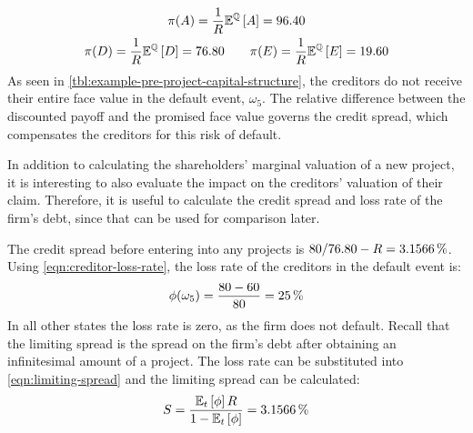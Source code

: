 \documentclass[main.tex]{subfiles}
\begin{document}
        \begin{gather*}
            \pi(A) = \frac{1}{R} \mathbb{E}^{\mathbb{Q}}\left[A\right] = \num{96.40} \\
            \pi(D) = \frac{1}{R} \mathbb{E}^{\mathbb{Q}}\left[D\right] = \num{76.80}
            \qquad \pi(E) = \frac{1}{R} \mathbb{E}^{\mathbb{Q}}\left[E\right] = \num{19.60}
        \end{gather*}
    As seen in \cref{tbl:example-pre-project-capital-structure},
    the creditors do not receive their entire face value in the default event, $\omega_5$.
    The relative difference between the discounted payoff and the promised face value
    governs the credit spread, which compensates the creditors for this risk of default.

    In addition to calculating the shareholders' marginal valuation of a new project,
    it is interesting to also evaluate the impact on the creditors' valuation of their claim. 
    Therefore, it is useful to calculate the credit spread and loss rate of the firm's debt,
    since that can be used for comparison later.

    The credit spread before entering into any projects is 
    $\num{80}/\num{76.80} - \grossrfrate = \pct{0.031566}$.
    Using \cref{eqn:creditor-loss-rate}, the loss rate of the creditors in the default event is:
        \begin{equation*}
            \phi(\omega_{5}) 
            = 
                \frac{
                    \num{80}-\num{60}
                }{
                    \num{80}
                } 
            = 
                \pct{0.25}
        \end{equation*}
    In all other states the loss rate is zero, as the firm does not default.
    Recall that the limiting spread is the spread on the firm's debt 
    after obtaining an infinitesimal amount of a project. 
    The loss rate can be substituted into \cref{eqn:limiting-spread} 
    and the limiting spread can be calculated:
        \begin{equation*}
            S
            =
            \frac{
                \mathbb{E}_{t}\left[\phi\right]
                R
            }{
                1 
                -
                \mathbb{E}_{t}\left[\phi\right] 
            } 
            =
            \pct{0.031566}
        \end{equation*}
\end{document}
